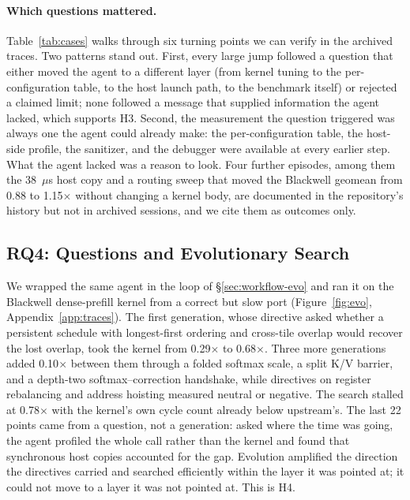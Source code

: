 \paragraph{Which questions mattered.} Table~\ref{tab:cases} walks through six turning points we can
verify in the archived traces. Two patterns stand out. First, every large jump followed a question
that either moved the agent to a different layer (from kernel tuning to the per-configuration table,
to the host launch path, to the benchmark itself) or rejected a claimed limit; none followed a
message that supplied information the agent lacked, which supports H3. Second, the measurement the
question triggered was always one the agent could already make: the per-configuration table, the
host-side profile, the sanitizer, and the debugger were available at every earlier step. What the
agent lacked was a reason to look. Four further episodes, among them the 38~$\mu$s host copy and a
routing sweep that moved the Blackwell geomean from 0.88 to 1.15$\times$ without changing a kernel
body, are documented in the repository's history but not in archived sessions, and we cite them as
outcomes only.

\subsection{RQ4: Questions and Evolutionary Search}
\label{sec:eval-evo}


We wrapped the same agent in the loop of \S\ref{sec:workflow-evo} and ran it on the Blackwell
dense-prefill kernel from a correct but slow port (Figure~\ref{fig:evo}, Appendix~\ref{app:traces}). The first generation,
whose directive asked whether a persistent schedule with longest-first ordering and cross-tile
overlap would recover the lost overlap, took the kernel from 0.29$\times$ to 0.68$\times$. Three
more generations added 0.10$\times$ between them through a folded softmax scale, a split K/V
barrier, and a depth-two softmax--correction handshake, while directives on register rebalancing and
address hoisting measured neutral or negative. The search stalled at 0.78$\times$ with the kernel's
own cycle count already below upstream's. The last 22 points came
from a question, not a generation: asked where the time was going, the agent profiled the whole call
rather than the kernel and found that synchronous host copies accounted for the gap. Evolution
amplified the direction the directives carried and searched efficiently within the layer it was
pointed at; it could not move to a layer it was not pointed at. This is H4.

